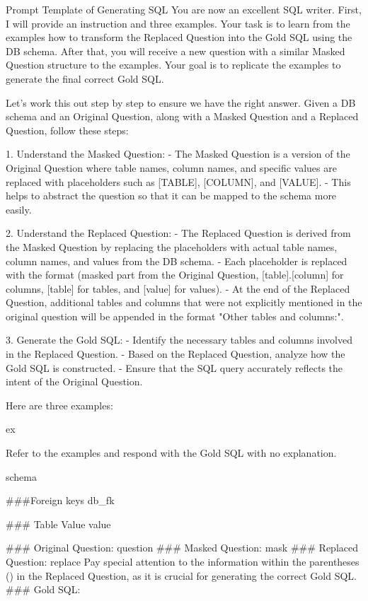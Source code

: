 \begin{myverbatim}{Prompt Template of Generating SQL}
You are now an excellent SQL writer. First, I will provide an instruction and three examples. Your task is to learn from the examples how to transform the Replaced Question into the Gold SQL using the DB schema. After that, you will receive a new question with a similar Masked Question structure to the examples. Your goal is to replicate the examples to generate the final correct Gold SQL.

Let's work this out step by step to ensure we have the right answer. Given a DB schema and an Original Question, along with a Masked Question and a Replaced Question, follow these steps:

1. Understand the Masked Question:
    - The Masked Question is a version of the Original Question where table names, column names, and specific values are replaced with placeholders such as [TABLE], [COLUMN], and [VALUE].
    - This helps to abstract the question so that it can be mapped to the schema more easily.

2. Understand the Replaced Question:
    - The Replaced Question is derived from the Masked Question by replacing the placeholders with actual table names, column names, and values from the DB schema.
    - Each placeholder is replaced with the format (masked part from the Original Question, [table].[column] for columns, [table] for tables, and [value] for values).
    - At the end of the Replaced Question, additional tables and columns that were not explicitly mentioned in the original question will be appended in the format "Other tables and columns:".

3. Generate the Gold SQL:
    - Identify the necessary tables and columns involved in the Replaced Question.
    - Based on the Replaced Question, analyze how the Gold SQL is constructed.
    - Ensure that the SQL query accurately reflects the intent of the Original Question.

Here are three examples:

{ex}

Refer to the examples and respond with the Gold SQL with no explanation.

{schema}

###Foreign keys
{db_fk}

### Table Value
{value}

### Original Question: {question}
### Masked Question: {mask}
### Replaced Question: {replace}
Pay special attention to the information within the parentheses () in the Replaced Question, as it is crucial for generating the correct Gold SQL.
### Gold SQL:
\end{myverbatim}

